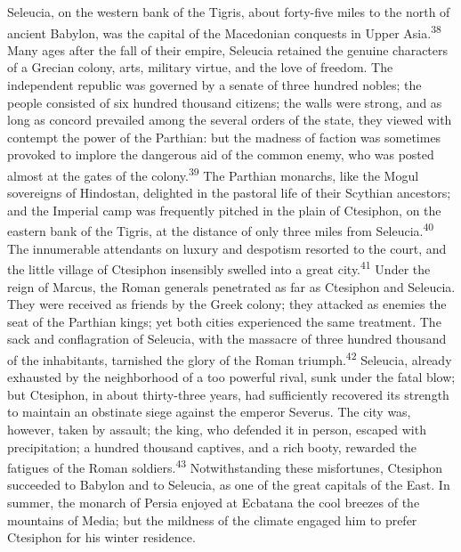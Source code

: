 Seleucia, on the western bank of the Tigris, about forty-five
miles to the north of ancient Babylon, was the capital of the
Macedonian conquests in Upper Asia.\textsuperscript{38} Many ages after the fall
of their empire, Seleucia retained the genuine characters of a
Grecian colony, arts, military virtue, and the love of freedom.
The independent republic was governed by a senate of three
hundred nobles; the people consisted of six hundred thousand
citizens; the walls were strong, and as long as concord prevailed
among the several orders of the state, they viewed with contempt
the power of the Parthian: but the madness of faction was
sometimes provoked to implore the dangerous aid of the common
enemy, who was posted almost at the gates of the colony.\textsuperscript{39} The
Parthian monarchs, like the Mogul sovereigns of Hindostan,
delighted in the pastoral life of their Scythian ancestors; and
the Imperial camp was frequently pitched in the plain of
Ctesiphon, on the eastern bank of the Tigris, at the distance of
only three miles from Seleucia.\textsuperscript{40} The innumerable attendants on
luxury and despotism resorted to the court, and the little
village of Ctesiphon insensibly swelled into a great city.\textsuperscript{41}
Under the reign of Marcus, the Roman generals penetrated as far
as Ctesiphon and Seleucia. They were received as friends by the
Greek colony; they attacked as enemies the seat of the Parthian
kings; yet both cities experienced the same treatment. The sack
and conflagration of Seleucia, with the massacre of three hundred
thousand of the inhabitants, tarnished the glory of the Roman
triumph.\textsuperscript{42} Seleucia, already exhausted by the neighborhood of a
too powerful rival, sunk under the fatal blow; but Ctesiphon, in
about thirty-three years, had sufficiently recovered its strength
to maintain an obstinate siege against the emperor Severus. The
city was, however, taken by assault; the king, who defended it in
person, escaped with precipitation; a hundred thousand captives,
and a rich booty, rewarded the fatigues of the Roman soldiers.\textsuperscript{43}
Notwithstanding these misfortunes, Ctesiphon succeeded to Babylon
and to Seleucia, as one of the great capitals of the East. In
summer, the monarch of Persia enjoyed at Ecbatana the cool
breezes of the mountains of Media; but the mildness of the
climate engaged him to prefer Ctesiphon for his winter residence.


